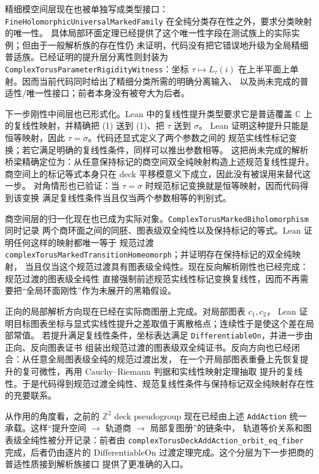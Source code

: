 \documentclass[UTF8,fontset=none,a4paper,11pt]{ctexart}
\begin{document}
精细模空间层现在也被单独写成类型接口：
\texttt{FineHolomorphicUniversalMarkedFamily} 在全纯分类存在性之外，要求分类映射的唯一性。
具体局部环面定理已经提供了这个唯一性字段在测试族上的实际实例；但由于一般解析族的存在性仍
未证明，代码没有把它错误地升级为全局精细普适族。已经证明的提升层分离性则封装为
\texttt{ComplexTorusParameterRigidityWitness}：坐标
\(\tau\mapsto L_\tau(i)\) 在上半平面上单射。因而当前代码同时给出了精细分类所需的明确分离输入、
以及尚未完成的普适性/唯一性接口；前者本身没有被夸大为后者。

下一步刚性中间层也已形式化。Lean 中的复线性提升类型要求它是普适覆盖
\(\mathbb C\) 上的复线性映射，并精确把 (1) 送到 (1)、把 \(\tau\) 送到 \(\sigma\)。
Lean 证明这种提升只能是恒等映射，因此 \(\tau=\sigma\)。代码还显式定义了两个参数之间的
规范实线性标记变换；若它满足明确的复线性条件，同样可以推出参数相等。
这把尚未完成的解析桥梁精确定位为：从任意保持标记的商空间双全纯映射构造上述规范复线性提升。
商空间上的标记等式本身只在 deck 平移模意义下成立，因此没有被误用来替代这一步。
对角情形也已验证：当 \(\tau=\sigma\) 时规范标记变换就是恒等映射，因而代码得到该变换
满足复线性条件当且仅当两个参数相等的判别式。

商空间层的归一化现在也已成为实际对象。\texttt{ComplexTorusMarkedBiholomorphism} 同时记录
两个商环面之间的同胚、图表级双全纯性以及保持标记的等式。Lean 证明任何这样的映射都唯一等于
规范过渡 \texttt{complexTorusMarkedTransitionHomeomorph}；并证明存在保持标记的双全纯映射，
当且仅当这个规范过渡具有图表级全纯性。现在反向解析刚性也已经完成：规范过渡的图表级全纯性
直接强制前述规范实线性标记变换复线性，因而不再需要把“全局环面刚性”作为未展开的黑箱假设。

正向的局部解析方向现在已经在实际商图册上完成。对局部图表 $c_1,c_2$，
Lean 证明目标图表坐标与显式实线性提升之差取值于离散格点；连续性于是使这个差在局部常值。
若提升满足复线性条件，坐标表达满足 \texttt{DifferentiableOn}，并进一步由正向、反向图表证书
组装出规范过渡的图表级双全纯证书。反向方向也已经闭合：从任意全局图表级全纯的规范过渡出发，
在一个开局部图表重叠上先恢复提升的复可微性，再用 Cauchy--Riemann 判据和实线性映射定理抽取
提升的复线性。于是代码得到规范过渡全纯性、规范复线性条件与保持标记双全纯映射存在性的充要联系。

从作用的角度看，之前的 \(\mathbb Z^2\) deck pseudogroup 现在已经由上述
\texttt{AddAction} 统一承载。这样“提升空间 \(\to\) 轨道商 \(\to\) 局部复图册”的链条中，
轨道等价关系和图表级全纯性被分开记录：前者由
\texttt{complexTorusDeckAddAction\_orbit\_eq\_fiber} 完成，后者仍由逐片的
\(\mathrm{DifferentiableOn}\) 过渡定理完成。这个分层为下一步把商的普适性质接到解析族接口
提供了更准确的入口。
\end{document}
